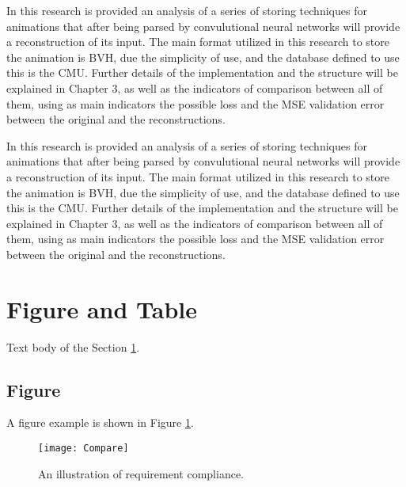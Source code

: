  In this research is provided an analysis of a series of storing techniques for animations that after being parsed by convulutional neural networks will provide a reconstruction
 of its input. The main format utilized in this research to store the animation is BVH, due the simplicity of use, and the database defined to use this is the CMU.
 Further details of the implementation and the structure will be explained in Chapter 3, as well as the indicators of comparison between all of them, using as main indicators
 the possible loss and the MSE validation error between the original and the reconstructions.
 
 In this research is provided an analysis of a series of storing techniques for animations that after being parsed by convulutional neural networks will provide a reconstruction
 of its input. The main format utilized in this research to store the animation is BVH, due the simplicity of use, and the database defined to use this is the CMU.
 Further details of the implementation and the structure will be explained in Chapter 3, as well as the indicators of comparison between all of them, using as main indicators
 the possible loss and the MSE validation error between the original and the reconstructions.
 
 
 
 \section{Figure and Table} \label{sec:FigureAndTable}

 Text body of the Section \ref{sec:FigureAndTable}.
 
 \subsection{Figure}  \label{subSec:Figure}

 A figure example is shown in Figure \ref{fig:Compare}.
 
 \begin{figure}
     \begin{center}
         \texttt{[image: Compare]}  %
        \end{center}
        \caption{An illustration of requirement compliance.}
        \label{fig:Compare}
    \end{figure}
    

